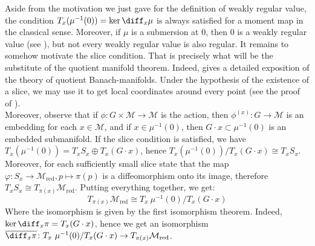 Aside from the motivation we just gave for the definition of weakly regular value, the condition \(T_x(\mu^{-1}(0))=\ker \diff_x \mu\) is always satisfied for a moment map in the classical sense. Moreover, if \(\mu\) is a submersion at \(0\), then \(0\) is a weakly regular value (see \parencite[Th. 3.5.4]{alma994602424702061}), but not every weakly regular value is also regular. It remains to somehow motivate the slice condition. That is precisely what will be the substitute of the quotient manifold theorem. Indeed, \parencite[Sec. 3.5]{alma994602424702061} gives a detailed exposition of the theory of quotient Banach-manifolds. Under the hypothesis of the existence of a slice, we may use it to get local coordinates around every point (see the proof of \parencite[Th. 3.5.25 and Lemma 3.5.26]{alma994602424702061}). \\

Moreover, observe that if \(\phi\colon G \times \mathcal{M} \to \mathcal{M}\) is the action, then \(\phi^{(x)}\colon G \to \mathcal{M}\) is an embedding for each \(x \in \mathcal{M}\), and if \(x \in \mu^{-1}(0)\), then \(G\cdot x \subset \mu^{-1}(0)\) is an embedded submanifold. If the slice condition is satisfied, we have \( T_x(\mu^{-1}(0))=T_xS_x\oplus T_x (G\cdot x)\), hence \(T_x(\mu^{-1}(0))/T_x(G \cdot x)\cong T_xS_x\). Moreover, for each sufficiently small slice \parencite[h. 3.5.25 and Lemma 3.5.26]{alma994602424702061} state that the map \(\varphi\colon S_x \to \mathcal{M}_{\mathrm{red}}, p \mapsto \pi(p)\) is a diffeomorphism onto its image, therefore \(T_xS_x \cong T_{\pi(x)} \mathcal{M}_{\mathrm{red}}\). Putting everything together, we get:
\begin{equation} \label{eq_tangent_to_reduced_M}
   T_{\pi(x)} \mathcal{M}_{\mathrm{red}} \cong T_x \ \mu^{-1}(0)/T_x(G \cdot x) 
\end{equation}
Where the isomorphism is given by the first isomorphism theorem. Indeed, \(\ker \diff_x \pi=T_x(G\cdot x)\), hence we get an isomorphism \(\overline{\diff_x \pi}\colon T_x \ \mu^{-1}(0)/T_x(G \cdot x)\to T_{\pi(x)}\mathcal{M}_{\mathrm{red}}\). \\

